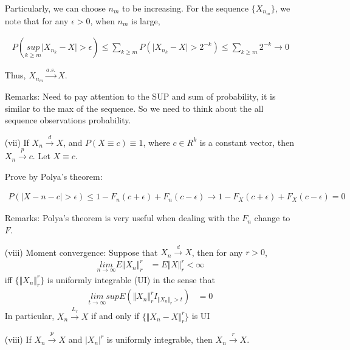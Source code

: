 \documentclass[11pt]{article} %
\begin{document}
\begin{itemize}
 Particularly, we can choose $n_m$ to be increasing. For the sequence $\{ X_{n_m} \}$, we note that for any $\epsilon > 0$, when $n_m$ is large,
 
 \begin{align*}
   P(\underset{k \geq m}{sup} \Big | X_{n_k}- X \Big | > \epsilon) \leq \underset{k \geq m}{\sum} P(\Big | X_{n_k}- X \Big | > 2^{-k}) \leq \underset{k \geq m}{\sum} 2^{-k} \rightarrow 0
 \end{align*}
 
 Thus, $X_{n_m} \xrightarrow {a.s.} X$.
 
 Remarks: Need to pay attention to the SUP and sum of probability, it is similar to the max of the sequence. So we need to think about the all sequence observations probability.
 
\item[(vii)]  If $X_n \xrightarrow {d} X$, and $P(X \equiv c) \equiv 1$, where $c \in R^k$ is a constant vector, then $X_n \xrightarrow {p} c$.
Let $X \equiv c$. 

Prove by Polya's theorem:

 \begin{align*}
 P(\Big | X-n -c \Big | > \epsilon) \leq 1- F_n(c + \epsilon) + F_n(c - \epsilon) \rightarrow 1 - F_X(c+\epsilon) + F_X(c - \epsilon) = 0
 \end{align*}

Remarks:  Polya's theorem is very useful when dealing with the $F_n$ change to $F$. 

\item[(viii)] Moment convergence: Suppose that $X_n \xrightarrow {d} X$, then for any $r > 0$, 
 \begin{align*}
   \underset{n \rightarrow \infty}{lim} E \Vert X_n \Vert_r^r &= E \Vert X \Vert_r^r < \infty
 \end{align*}
iff $\{ \Vert X_n \Vert_r^r \}$ is uniformly integrable (UI) in the sense that 
 \begin{align*}
   \underset{t \rightarrow \infty}{lim} sup E (\Vert X_n \Vert_r^r  I_{\Vert X_n \Vert_r > t})&= 0
 \end{align*}
In particular, $X_n \xrightarrow {L_r} X$ if and only if $\{ \Vert X_n - X\Vert_r^r \}$ is UI

\item[(viii)] If $X_n \xrightarrow {p} X$ and $|X_n|^r$ is uniformly integrable, then $X_n \xrightarrow {r} X$. 

\end{itemize}
\end{document}
